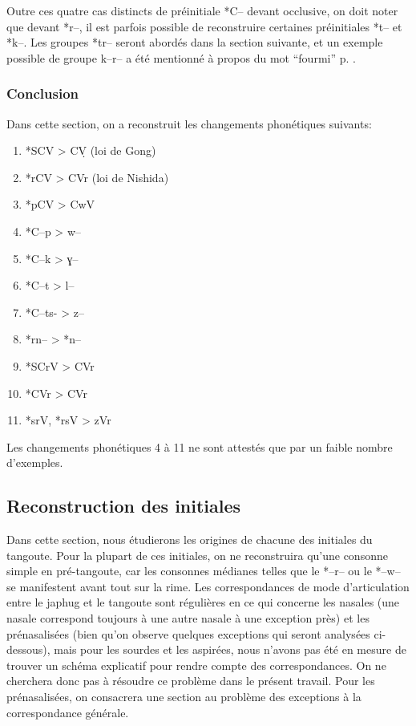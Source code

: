 \documentclass[oldfontcommands,twoside,a4paper,11pt,draft]{memoir}
\newcommand{\ipapl}[1]{{\phondroit #1}}
\begin{document}
Outre ces quatre cas distincts de préinitiale *C-- devant occlusive, on doit noter que devant *r--, il est parfois possible de reconstruire certaines préinitiales *t-- et *k--. Les groupes *tr-- seront abordés dans la section suivante, et un exemple possible de groupe k--r-- a été mentionné à propos du mot ``fourmi'' p. \pageref{analyse:fourmi}.

\subsubsection{Conclusion}

Dans cette section, on a reconstruit les changements phonétiques suivants:
\begin{enumerate}
\item *SCV > \ipapl{CṾ} (loi de Gong) 
\item 	*rCV > CVr (loi de Nishida)
\item 	*pCV > CwV
\item 	*C--p > w-- 
\item 	*C--k > \ipapl{ɣ--}
\item 	*C--t > l--
\item 	*C--ts- > z--
\item 	*rn-- > *n--
\item 	*SCrV > CVr
\item 	*CVr > CVr
\item 	*srV, *rsV > zVr
\end{enumerate}
Les changements phonétiques 4 à 11 ne sont attestés que par un faible nombre  d'exemples.

\subsection{Reconstruction des initiales} \label{subsec:initialestg}
Dans cette section, nous étudierons les origines de chacune des initiales du tangoute. Pour la plupart de ces initiales, on ne reconstruira qu'une consonne simple en pré-tangoute, car les consonnes médianes telles que le *--r-- ou le *--w-- se manifestent avant tout sur la rime. 
Les correspondances de mode d'articulation entre le japhug et le tangoute sont régulières en ce qui concerne les nasales (une nasale correspond toujours à une autre nasale à une exception près) et les prénasalisées (bien qu'on observe quelques exceptions qui seront analysées ci-dessous), mais pour les sourdes et les aspirées, nous n'avons pas été en mesure de trouver un schéma explicatif pour rendre compte des correspondances. On ne cherchera donc pas à résoudre ce problème dans le présent travail. Pour les prénasalisées, on consacrera une section au problème des exceptions  à la correspondance générale.
\end{document}
